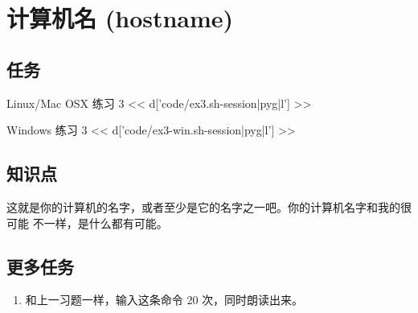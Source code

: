 \chapter{计算机名 (hostname)}

\section{任务}

\begin{code}{Linux/Mac OSX 练习 3}
<< d['code/ex3.sh-session|pyg|l'] >>
\end{code}

\begin{code}{Windows 练习 3}
<< d['code/ex3-win.sh-session|pyg|l'] >>
\end{code}

\section{知识点}

这就是你的计算机的名字，或者至少是它的名字之一吧。你的计算机名字和我的很可能
不一样，是什么都有可能。

\section{更多任务}

\begin{enumerate}
\item 和上一习题一样，输入这条命令 20 次，同时朗读出来。
\end{enumerate}

